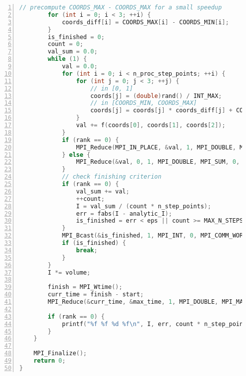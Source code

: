 \documentclass[oneside, final, 12pt]{extarticle}
\begin{document}
\begin{lstlisting}[language=C, style=CStyle, numbers=left]
        // precompute COORDS_MAX - COORDS_MAX for a small speedup
        for (int i = 0; i < 3; ++i) {
            coords_diff[i] = COORDS_MAX[i] - COORDS_MIN[i];
        }
        is_finished = 0;
        count = 0;
        val_sum = 0.0;
        while (1) {
            val = 0.0;
            for (int i = 0; i < n_proc_step_points; ++i) {
                for (int j = 0; j < 3; ++j) {
                    // in [0, 1]
                    coords[j] = (double)rand() / INT_MAX;
                    // in [COORDS_MIN, COORDS_MAX]
                    coords[j] = coords[j] * coords_diff[j] + COORDS_MIN[j];
                }
                val += f(coords[0], coords[1], coords[2]);
            }
            if (rank == 0) {
                MPI_Reduce(MPI_IN_PLACE, &val, 1, MPI_DOUBLE, MPI_SUM, 0, MPI_COMM_WORLD);
            } else {
                MPI_Reduce(&val, 0, 1, MPI_DOUBLE, MPI_SUM, 0, MPI_COMM_WORLD);
            }
            // check finishing criterion
            if (rank == 0) {
                val_sum += val;
                ++count;
                I = val_sum / (count * n_step_points);
                err = fabs(I - analytic_I);
                is_finished = err < eps || count >= MAX_N_STEPS;
            }
            MPI_Bcast(&is_finished, 1, MPI_INT, 0, MPI_COMM_WORLD);
            if (is_finished) {
                break;
            }
        }
        I *= volume;

        finish = MPI_Wtime();
        curr_time = finish - start;
        MPI_Reduce(&curr_time, &max_time, 1, MPI_DOUBLE, MPI_MAX, 0, MPI_COMM_WORLD);

        if (rank == 0) {
            printf("%f %f %d %f\n", I, err, count * n_step_points, max_time);
        }
    }

    MPI_Finalize();
    return 0;
}
\end{lstlisting}
\end{document}
